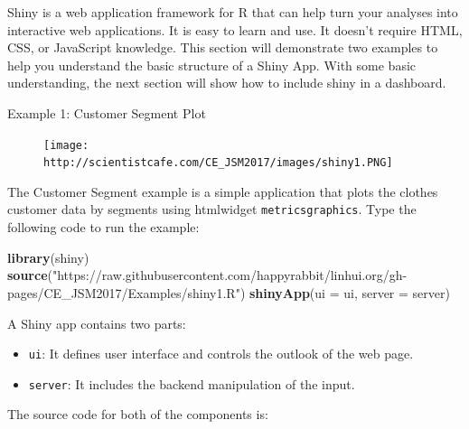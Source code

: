 \documentclass[]{book}
\newenvironment{Shaded}{\begin{snugshade}}{\end{snugshade}}
\newcommand{\KeywordTok}[1]{\textcolor[rgb]{0.13,0.29,0.53}{\textbf{{#1}}}}
\newcommand{\DataTypeTok}[1]{\textcolor[rgb]{0.13,0.29,0.53}{{#1}}}
\newcommand{\StringTok}[1]{\textcolor[rgb]{0.31,0.60,0.02}{{#1}}}
\newcommand{\NormalTok}[1]{{#1}}
\providecommand{\tightlist}{%
  \setlength{\itemsep}{0pt}\setlength{\parskip}{0pt}}
\theoremstyle{definition}
\theoremstyle{definition}
\theoremstyle{remark}
\begin{document}
Shiny is a web application framework for R that can help turn your
analyses into interactive web applications. It is easy to learn and use.
It doesn't require HTML, CSS, or JavaScript knowledge. This section will
demonstrate two examples to help you understand the basic structure of a
Shiny App. With some basic understanding, the next section will show how
to include shiny in a dashboard.

Example 1: Customer Segment Plot

\begin{figure}[htbp]
\centering
\texttt{[image: http://scientistcafe.com/CE\_JSM2017/images/shiny1.PNG]}
\caption{}
\end{figure}

The Customer Segment example is a simple application that plots the
clothes customer data by segments using htmlwidget
\texttt{metricsgraphics}. Type the following code to run the example:

\begin{Shaded}
\begin{Highlighting}[]
\KeywordTok{library}\NormalTok{(shiny)}
\KeywordTok{source}\NormalTok{(}\StringTok{"https://raw.githubusercontent.com/happyrabbit/linhui.org/gh-pages/CE_JSM2017/Examples/shiny1.R"}\NormalTok{)}
\KeywordTok{shinyApp}\NormalTok{(}\DataTypeTok{ui =} \NormalTok{ui, }\DataTypeTok{server =} \NormalTok{server)}
\end{Highlighting}
\end{Shaded}

A Shiny app contains two parts:

\begin{itemize}
\tightlist
\item
  \texttt{ui}: It defines user interface and controls the outlook of the
  web page.
\item
  \texttt{server}: It includes the backend manipulation of the input.
\end{itemize}

The source code for both of the components is:
\end{document}
